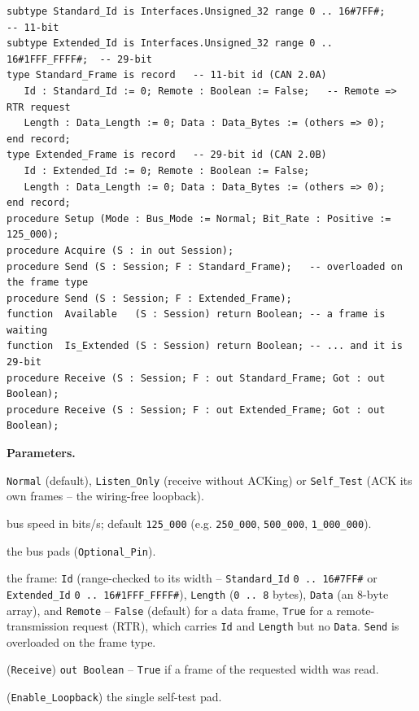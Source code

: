 \begin{lstlisting}
subtype Standard_Id is Interfaces.Unsigned_32 range 0 .. 16#7FF#;        -- 11-bit
subtype Extended_Id is Interfaces.Unsigned_32 range 0 .. 16#1FFF_FFFF#;  -- 29-bit
type Standard_Frame is record   -- 11-bit id (CAN 2.0A)
   Id : Standard_Id := 0; Remote : Boolean := False;   -- Remote => RTR request
   Length : Data_Length := 0; Data : Data_Bytes := (others => 0);
end record;
type Extended_Frame is record   -- 29-bit id (CAN 2.0B)
   Id : Extended_Id := 0; Remote : Boolean := False;
   Length : Data_Length := 0; Data : Data_Bytes := (others => 0);
end record;
procedure Setup (Mode : Bus_Mode := Normal; Bit_Rate : Positive := 125_000);
procedure Acquire (S : in out Session);
procedure Send (S : Session; F : Standard_Frame);   -- overloaded on the frame type
procedure Send (S : Session; F : Extended_Frame);
function  Available   (S : Session) return Boolean; -- a frame is waiting
function  Is_Extended (S : Session) return Boolean; -- ... and it is 29-bit
procedure Receive (S : Session; F : out Standard_Frame; Got : out Boolean);
procedure Receive (S : Session; F : out Extended_Frame; Got : out Boolean);
\end{lstlisting}

\textbf{Parameters.}
\begin{description}[style=nextline]
\item[\texttt{Mode}] \texttt{Normal} (default), \texttt{Listen\_Only} (receive
  without ACKing) or \texttt{Self\_Test} (ACK its own frames -- the wiring-free
  loopback).
\item[\texttt{Bit\_Rate}] bus speed in bits/s; default \texttt{125\_000} (e.g.
  \texttt{250\_000}, \texttt{500\_000}, \texttt{1\_000\_000}).
\item[\texttt{Tx}, \texttt{Rx}] the bus pads (\texttt{Optional\_Pin}).
\item[\texttt{F} (\texttt{Standard\_Frame} / \texttt{Extended\_Frame})] the frame:
  \texttt{Id} (range-checked to its width -- \texttt{Standard\_Id}
  \texttt{0\,..\,16\#7FF\#} or \texttt{Extended\_Id}
  \texttt{0\,..\,16\#1FFF\_FFFF\#}), \texttt{Length} (\texttt{0\,..\,8} bytes),
  \texttt{Data} (an 8-byte array), and \texttt{Remote} -- \texttt{False} (default)
  for a data frame, \texttt{True} for a remote-transmission request (RTR), which
  carries \texttt{Id} and \texttt{Length} but no \texttt{Data}. \texttt{Send} is
  overloaded on the frame type.
\item[\texttt{Got}] (\texttt{Receive}) \texttt{out Boolean} -- \texttt{True} if a
  frame of the requested width was read.
\item[\texttt{Pad}] (\texttt{Enable\_Loopback}) the single self-test pad.
\end{description}

